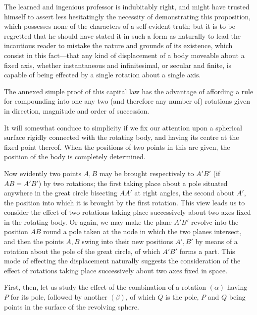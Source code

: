 \documentclass[11pt]{article}
\newcommand{\sourcepage}[1]{\marginpar{\scriptsize p.~#1}}
\begin{document}
{{The learned and ingenious professor is indubitably right, and might have trusted himself to assert less hesitatingly the necessity of demonstrating this proposition, which possesses none of the characters of a self-evident truth; but it is to be regretted that he should have stated it in such a form as naturally to lead the incautious reader to mistake the nature and grounds of its existence, which consist in this fact---that any kind of displacement of a body moveable about a fixed axis, whether instantaneous and infinitesimal, or secular and finite, is capable of being effected by a single rotation about a single axis.

The annexed simple proof of this capital law has the advantage of affording a rule for compounding into one any two (and therefore any number of) rotations given in direction, magnitude and order of succession.

\sourcepage{158}
It will somewhat conduce to simplicity if we fix our attention upon a spherical surface rigidly connected with the rotating body, and having its centre at the fixed point thereof. When the positions of two points in this are given, the position of the body is completely determined.

Now evidently two points $A,B$ may be brought respectively to $A'B'$ (if $AB=A'B'$) by two rotations; the first taking place about a pole situated anywhere in the great circle bisecting $AA'$ at right angles, the second about $A'$, the position into which it is brought by the first rotation. This view leads us to consider the effect of two rotations taking place successively about two axes fixed in the rotating body. Or again, we may make the plane $A'B'$ revolve into the position $AB$ round a pole taken at the node in which the two planes intersect, and then the points $A,B$ swing into their new positions $A',B'$ by means of a rotation about the pole of the great circle, of which $A'B'$ forms a part. This mode of effecting the displacement naturally suggests the consideration of the effect of rotations taking place successively about two axes fixed in space.

First, then, let us study the effect of the combination of a rotation $(\alpha)$ having $P$ for its pole, followed by another $(\beta)$, of which $Q$ is the pole, $P$ and $Q$ being points in the surface of the revolving sphere.

}}
\end{document}
